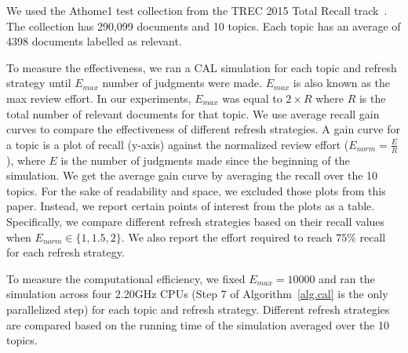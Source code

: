 \label{sec.dataeval}
We used the Athome1 test collection from the TREC 2015 Total Recall
track~\cite{roegiest2015trec}. The collection has 290,099 documents and 10
topics. Each topic has an average of 4398 documents labelled as relevant.


To measure the effectiveness, we ran a CAL simulation for each topic and refresh
strategy until $E_{max}$ number of judgments were made. $E_{max}$ is also known
as the max review effort. In our experiments, $E_{max}$ was equal to $2\times R$ where
$R$ is the total number of relevant documents for that topic. We use average
recall gain curves to compare the effectiveness of different refresh strategies.
A gain curve for a topic is a plot of recall (y-axis) against the normalized
review effort ($E_{norm} = \frac{E}{R}$), where $E$ is the number of judgments made since
the beginning of the simulation. We get the average gain curve by averaging the
recall over the 10 topics. For the sake of readability and space, we excluded
those plots from this paper. Instead, we report certain points of interest from
the plots as a table. Specifically, we compare different refresh strategies based
on their recall values when $E_{norm} \in \{1,1.5,2\}$. We also report the
effort required to reach $75\%$ recall for each refresh strategy.

To measure the computational efficiency, we fixed $E_{max}=10000$ and ran the
simulation across four 2.20GHz CPUs (Step 7 of Algorithm~\ref{alg.cal} is the
only parallelized step) for each topic and refresh strategy. Different refresh
strategies are compared based on the running time of the simulation averaged
over the 10 topics.
